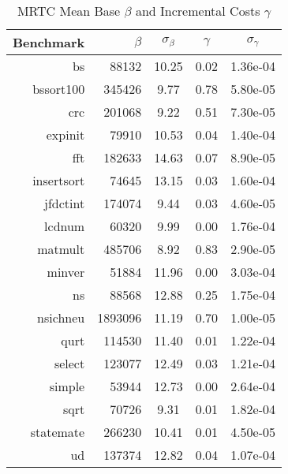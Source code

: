 \begin{table}[ht]
  \begin{center}
    \begin{tabular}{r|r|c|c|c}
      Benchmark & ${\beta}$ & ${\sigma_\beta}$ & ${\gamma}$ & ${\sigma_\gamma}$ \\
      \hline
        bs           &      88132 &      10.25 &       0.02 &   1.36e-04 \\
        bssort100    &     345426 &       9.77 &       0.78 &   5.80e-05 \\
        crc          &     201068 &       9.22 &       0.51 &   7.30e-05 \\
        expinit      &      79910 &      10.53 &       0.04 &   1.40e-04 \\
        fft          &     182633 &      14.63 &       0.07 &   8.90e-05 \\
        insertsort   &      74645 &      13.15 &       0.03 &   1.60e-04 \\
        jfdctint     &     174074 &       9.44 &       0.03 &   4.60e-05 \\
        lcdnum       &      60320 &       9.99 &       0.00 &   1.76e-04 \\
        matmult      &     485706 &       8.92 &       0.83 &   2.90e-05 \\
        minver       &      51884 &      11.96 &       0.00 &   3.03e-04 \\
        ns           &      88568 &      12.88 &       0.25 &   1.75e-04 \\
        nsichneu     &    1893096 &      11.19 &       0.70 &   1.00e-05 \\
        qurt         &     114530 &      11.40 &       0.01 &   1.22e-04 \\
        select       &     123077 &      12.49 &       0.03 &   1.21e-04 \\
        simple       &      53944 &      12.73 &       0.00 &   2.64e-04 \\
        sqrt         &      70726 &       9.31 &       0.01 &   1.82e-04 \\
        statemate    &     266230 &      10.41 &       0.01 &   4.50e-05 \\
        ud           &     137374 &      12.82 &       0.04 &   1.07e-04 \\

      \end{tabular}
    \caption{MRTC Mean Base ${\beta}$ and Incremental Costs ${\gamma}$}
    \label{table:mrtc-costs}
  \end{center}
\end{table}
